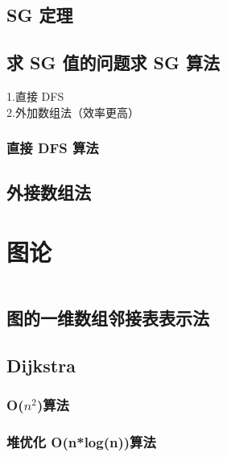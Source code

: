 \documentclass[a4paper]{article}
\begin{document}
\begin{CJK*}{UTF8}{gbsn}
\begin{multicols}{3}
\begin{flushleft}
\subsection{SG 定理}


\subsection{求 SG 值的问题求 SG 算法}
1.直接 DFS\\
2.外加数组法（效率更高）\\

\subsubsection{直接 DFS 算法}


\subsection{外接数组法}


\section{图论}
\begin{lstlisting}
\end{lstlisting}

\subsection{图的一维数组邻接表表示法}


\subsection{Dijkstra}


\subsubsection{O(\texorpdfstring{$n^2$}.)算法}


\subsubsection{堆优化 O(n*log(n))算法}



\end{flushleft}
\end{multicols}
\end{CJK*}
\end{document}

